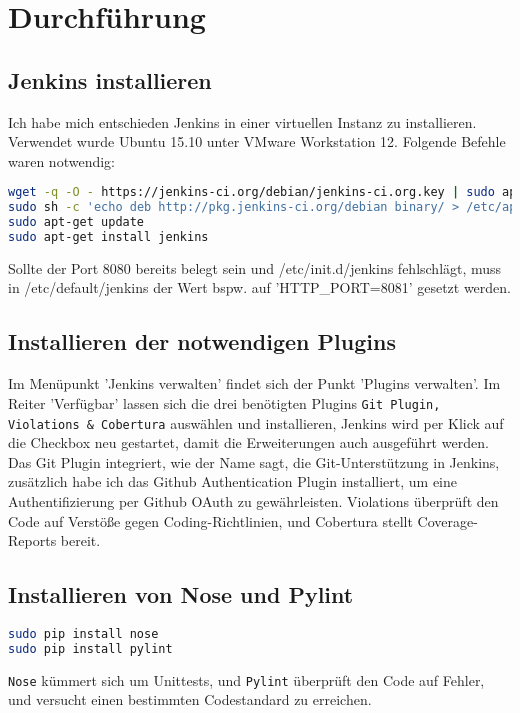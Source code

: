 \documentclass[letterpaper, 12pt]{article}
\let\tempsection\section
\renewcommand\section[1]{\vspace{-0.3cm}\tempsection{#1}\vspace{-0.3cm}}
\let\tempsubsection\subsection
\renewcommand\subsection[1]{\vspace{0cm}\tempsubsection{#1}\vspace{0cm}}
\begin{document}
\section{Durchführung}

\subsection{Jenkins installieren}
Ich habe mich entschieden Jenkins in einer virtuellen Instanz zu installieren. Verwendet wurde Ubuntu 15.10 unter VMware Workstation 12. Folgende Befehle waren notwendig: \\

\begin{lstlisting}[frame=single,language=bash, caption=Jenkins in Ubuntu installieren \cite{jenins}]
wget -q -O - https://jenkins-ci.org/debian/jenkins-ci.org.key | sudo apt-key add -
sudo sh -c 'echo deb http://pkg.jenkins-ci.org/debian binary/ > /etc/apt/sources.list.d/jenkins.list'
sudo apt-get update
sudo apt-get install jenkins
\end{lstlisting}

Sollte der Port 8080 bereits belegt sein und /etc/init.d/jenkins fehlschlägt, muss in /etc/default/jenkins der Wert bspw. auf 'HTTP\_PORT=8081' gesetzt werden.

\subsection{Installieren der notwendigen Plugins}
Im Menüpunkt 'Jenkins verwalten' findet sich der Punkt 'Plugins verwalten'. Im Reiter 'Verfügbar' lassen sich die drei benötigten Plugins \texttt{Git Plugin, Violations \& Cobertura} auswählen und installieren, Jenkins wird per Klick auf die Checkbox neu gestartet, damit die Erweiterungen auch ausgeführt werden. \\
Das Git Plugin integriert, wie der Name sagt, die Git-Unterstützung in Jenkins, zusätzlich habe ich das Github Authentication Plugin installiert, um eine Authentifizierung per Github OAuth zu gewährleisten. Violations überprüft den Code auf Verstöße gegen Coding-Richtlinien, und Cobertura stellt Coverage-Reports bereit. 

\subsection{Installieren von Nose und Pylint}

\begin{lstlisting}[frame=single,language=bash, caption=Nose und Pylint mit pip installieren]
sudo pip install nose
sudo pip install pylint
\end{lstlisting}

\texttt{Nose} kümmert sich um Unittests, und \texttt{Pylint} überprüft den Code auf Fehler, und versucht einen bestimmten Codestandard zu erreichen.

\clearpage



\lstlistoflistings
\listoffigures
\end{document}
